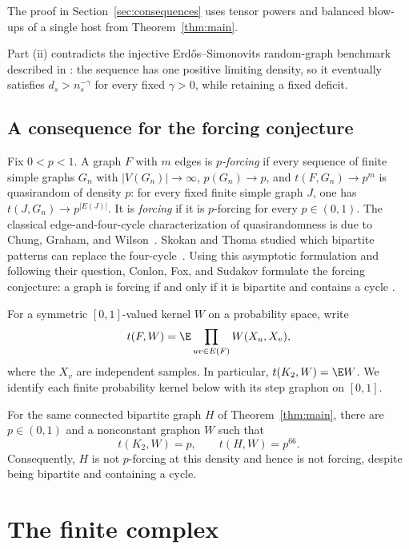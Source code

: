 The proof in Section~\ref{sec:consequences} uses tensor powers and
balanced blow-ups of a single host from Theorem~\ref{thm:main}.

Part (ii) contradicts the injective Erd\H{o}s--Simonovits
random-graph benchmark described in
\cite[Section~1]{conlonfoxsudakov2010}: the sequence has one positive
limiting density, so it eventually satisfies \(d_s>n_s^{-\gamma}\)
for every fixed \(\gamma>0\), while retaining a fixed deficit.

\subsection*{A consequence for the forcing conjecture}

Fix \(0<p<1\). A graph \(F\) with \(m\) edges is \emph{\(p\)-forcing}
if every sequence of finite simple graphs \(G_n\) with
\(|V(G_n)|\to\infty\), \(p(G_n)\to p\), and
\(t(F,G_n)\to p^m\) is quasirandom of density \(p\): for every fixed
finite simple graph \(J\), one has
\(t(J,G_n)\to p^{|E(J)|}\). It is \emph{forcing} if it is
\(p\)-forcing for every \(p\in(0,1)\). The classical edge-and-four-cycle
characterization of quasirandomness is due to Chung, Graham, and
Wilson~\cite{chunggrahamwilson1989}. Skokan and Thoma studied which
bipartite patterns can replace the four-cycle~\cite{skokanthoma2004}.
Using this asymptotic formulation and following their question,
Conlon, Fox, and Sudakov formulate the forcing conjecture: a graph is forcing if and
only if it is bipartite and contains a cycle
\cite[Section~1, equation~(2) and Conjecture~2]{conlonfoxsudakov2010}.

For a symmetric \([0,1]\)-valued kernel \(W\) on a probability space,
write
\[
t(F,W)=\E\prod_{uv\in E(F)}W(X_u,X_v),
\]
where the \(X_v\) are independent samples. In particular,
\(t(K_2,W)=\E W\). We identify each finite probability kernel below
with its step graphon on \([0,1]\).

\begin{corollary}
\label{cor:forcing}
For the same connected bipartite graph \(H\) of
Theorem~\ref{thm:main}, there are \(p\in(0,1)\) and a nonconstant
graphon \(W\) such that
\[
t(K_2,W)=p,\qquad t(H,W)=p^{66}.
\]
Consequently, \(H\) is not \(p\)-forcing at this density and hence is
not forcing, despite being bipartite and containing a cycle.
\end{corollary}
\section{The finite complex}
\label{sec:complex}

